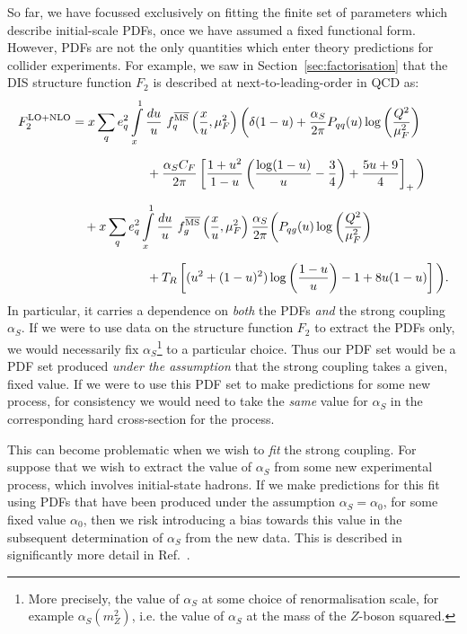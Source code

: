 \documentclass[withindex,glossary]{cam-thesis}
\begin{document}
So far, we have focussed exclusively on fitting the finite set of parameters which describe initial-scale PDFs, once we have assumed a fixed functional form. However, PDFs are not the only quantities which enter theory predictions for collider experiments. For example, we saw in Section~\ref{sec:factorisation} that the DIS structure function $F_2$ is described at next-to-leading-order in QCD as:
\begin{align}
F_2^{\text{LO+NLO}} &= x \sum_{q} e_q^2 \int\limits_{x}^{1} \frac{du}{u}\ f^{\overline{\text{MS}}}_q\left(\frac{x}{u},\mu_F^2\right)   \bigg( \delta(1-u) + \frac{\alpha_S}{2\pi} P_{qq}(u) \log\left( \frac{Q^2}{\mu_F^2} \right) \notag\\[1.5ex]
&\qquad\qquad\qquad + \frac{\alpha_S C_F}{2\pi} \left[ \frac{1+u^2}{1-u} \left( \frac{\log(1-u)}{u} - \frac{3}{4} \right) + \frac{5u + 9}{4}\right]_+\bigg) \notag \\[1.5ex]
&\quad + x \sum_{q} e_q^2 \int\limits_{x}^{1} \frac{du}{u}\ f^{\overline{\text{MS}}}_g\left( \frac{x}{u}, \mu_F^2\right) \frac{\alpha_S}{2\pi} \bigg( P_{qg}(u) \log\left( \frac{Q^2}{\mu_F^2}\right) \notag \\[1.5ex]
&\qquad\qquad\qquad + T_R \left[ (u^2 + (1-u)^2) \log\left( \frac{1-u}{u} \right) - 1 + 8u(1-u)\right] \bigg).
\end{align}
In particular, it carries a dependence on \textit{both} the PDFs \textit{and} the strong coupling $\alpha_S$. If we were to use data on the structure function $F_2$ to extract the PDFs only, we would necessarily fix $\alpha_S$\footnote{More precisely, the value of $\alpha_S$ at some choice of renormalisation scale, for example $\alpha_S(m_Z^2)$, i.e. the value of $\alpha_S$ at the mass of the $Z$-boson squared.} to a particular choice. Thus our PDF set would be a PDF set produced \textit{under the assumption} that the strong coupling takes a given, fixed value. If we were to use this PDF set to make predictions for some new process, for consistency we would need to take the \textit{same} value for $\alpha_S$ in the corresponding hard cross-section for the process.

This can become problematic when we wish to \textit{fit} the strong coupling. For suppose that we wish to extract the value of $\alpha_S$ from some new experimental process, which involves initial-state hadrons. If we make predictions for this fit using PDFs that have been produced under the assumption $\alpha_S = \alpha_0$, for some fixed value $\alpha_0$, then we risk introducing a bias towards this value in the subsequent determination of $\alpha_S$ from the new data. This is described in significantly more detail in Ref.~\cite{Forte:2020pyp}. \\
\end{document}
